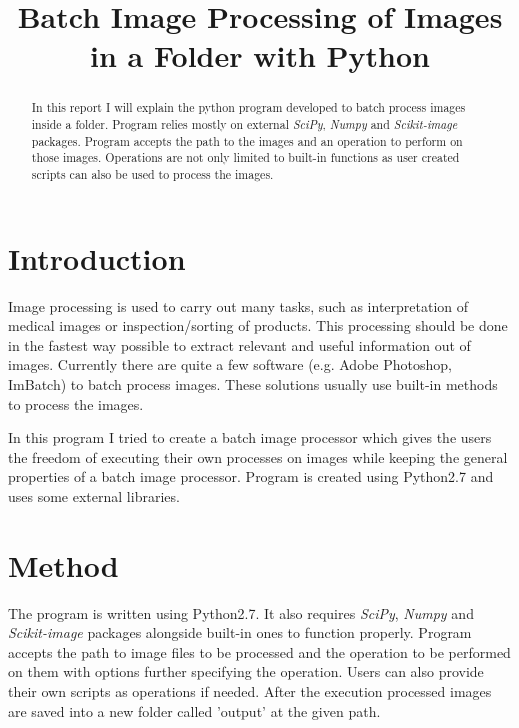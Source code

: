\documentclass[conference,compsoc]{IEEEtran}
\begin{document}
\title{Batch Image Processing of Images in a Folder with Python}
\author{
}

\maketitle

\begin{abstract}
In this report I will explain the python program developed to batch process images
inside a folder. Program relies mostly on external \textit{SciPy}, \textit{Numpy} and
\textit{Scikit-image} packages. Program accepts the path to the images and an operation
to perform on those images. Operations are not only limited to built-in functions as user
created scripts can also be used to process the images.

\end{abstract}

\section{Introduction}
Image processing is used to carry out many tasks, such as interpretation of medical images or inspection/sorting of products. This processing should be done in the fastest way possible to extract relevant and useful information out of images. Currently there are quite a few software (e.g. Adobe Photoshop, ImBatch) to batch process images. These solutions usually use built-in methods to process the images.

In this program I tried to create a batch image processor which gives the users the freedom of executing their own processes on images while keeping the general properties of a batch image processor. Program is created using Python2.7 and uses some external libraries. 

\section{Method}
The program is written using Python2.7. It also requires \textit{SciPy}, \textit{Numpy} and
\textit{Scikit-image} packages alongside built-in ones to function properly. Program accepts the path to image files to be processed and the operation to be performed on them with options further specifying the operation. Users can also provide their own scripts as operations if needed. After the execution processed images are saved into a new folder called 'output' at the given path.
\end{document}
